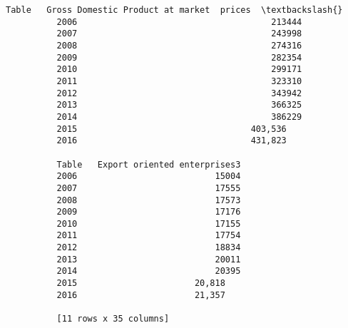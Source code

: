 \documentclass[11pt]{article}
\begin{document}
\begin{Verbatim}[commandchars=\\\{\}]
          Table   Gross Domestic Product at market  prices  \textbackslash{}
          2006                                      213444   
          2007                                      243998   
          2008                                      274316   
          2009                                      282354   
          2010                                      299171   
          2011                                      323310   
          2012                                      343942   
          2013                                      366325   
          2014                                      386229   
          2015                                  403,536      
          2016                                  431,823      
          
          Table   Export oriented enterprises3  
          2006                           15004  
          2007                           17555  
          2008                           17573  
          2009                           17176  
          2010                           17155  
          2011                           17754  
          2012                           18834  
          2013                           20011  
          2014                           20395  
          2015                       20,818     
          2016                       21,357     
          
          [11 rows x 35 columns]
\end{Verbatim}
            
\end{document}
